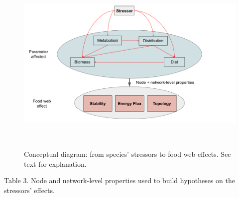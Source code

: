 \documentclass[
]{article}
\begin{document}
\begin{figure}
\centering
\includegraphics[width=6.27in,height=3.528in]{Figures/Figure2_StressorDiagram.png}
\caption{Conceptual diagram: from species' stressors to food web
effects. See text for explanation.}
\end{figure}

\scriptsize

Table 3. Node and network-level properties used to build hypotheses on
the stressors' effects.
\end{document}

